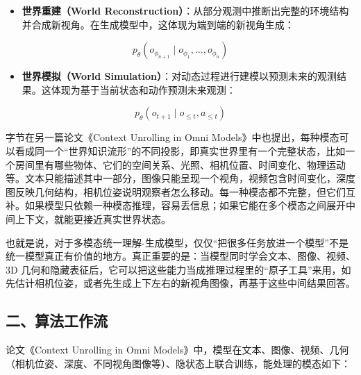 \begin{itemize}
\tightlist
\item
  \textbf{世界重建（World Reconstruction）}：从部分观测中推断出完整的环境结构并合成新视角。在生成模型中，这体现为端到端的新视角生成：
\end{itemize}

\[
p_{\theta}(o_{\phi_{n+1}}\mid o_{\phi_1},\ldots,o_{\phi_n})
\]

\begin{itemize}
\tightlist
\item
  \textbf{世界模拟（World Simulation）}：对动态过程进行建模以预测未来的观测结果。这体现为基于当前状态和动作预测未来观测：
\end{itemize}

\[
p_{\theta}(o_{t+1}\mid o_{\le t},a_{\le t})
\]

字节在另一篇论文《Context Unrolling in Omni Models》中也提出，每种模态可以看成同一个``世界知识流形''的不同投影，即真实世界里有一个完整状态，比如一个房间里有哪些物体、它们的空间关系、光照、相机位置、时间变化、物理运动等。文本只能描述其中一部分，图像只能呈现一个视角，视频包含时间变化，深度图反映几何结构，相机位姿说明观察者怎么移动。每一种模态都不完整，但它们互补。如果模型只依赖一种模态推理，容易丢信息；如果它能在多个模态之间展开中间上下文，就能更接近真实世界状态。

也就是说，对于多模态统一理解-生成模型，仅仅``把很多任务放进一个模型''不是统一模型真正有价值的地方。真正重要的是：当模型同时学会文本、图像、视频、3D 几何和隐藏表征后，它可以把这些能力当成推理过程里的``原子工具''来用，如先估计相机位姿，或者先生成上下左右的新视角图像，再基于这些中间结果回答。

\hypertarget{ux4e8cux7b97ux6cd5ux5de5ux4f5cux6d41-1}{%
\subsection{二、算法工作流}\label{ux4e8cux7b97ux6cd5ux5de5ux4f5cux6d41-1}}

论文《Context Unrolling in Omni Models》中，模型在文本、图像、视频、几何（相机位姿、深度、不同视角图像等）、隐状态上联合训练，能处理的模态如下：

